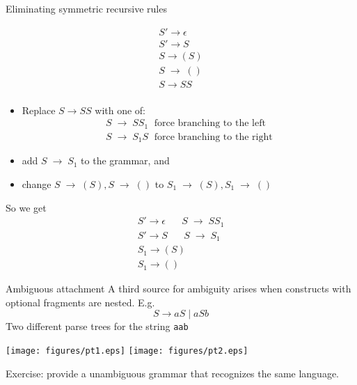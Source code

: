 \documentclass{prosper}%
\newcommand{\ra}{\mbox{$\;\rightarrow\;$}}
\begin{document}
\begin{slide}{Eliminating symmetric recursive rules}
\begin{minipage}{3cm}
\[
\begin{array}{l}
S'\rightarrow \epsilon\\
S'\rightarrow S\\
S\rightarrow (S)\\
S\ra ()\\

S \rightarrow SS\\
\end{array}
\]
\end{minipage}
\begin{minipage}{8cm}
\begin{itemize}
\item Replace    $S \rightarrow  SS$ with one of:
\[
\begin{array}{l}
    S \ra SS_1 \;\mbox{		 force branching to the left}\\
    S \ra S_1S 	\;\mbox{	 force branching to the right}
\end{array}
\]
\item add $S\ra S_1$ to the grammar, and 
\item change $S\ra (S), S\ra ()$ to $S_1\ra (S), S_1\ra ()$
\end{itemize}
\end{minipage}

\vspace{0.5cm}
So we get
\[
\begin{array}{l}
S'\rightarrow \epsilon\;\;\;\;\;\;S\ra SS_1\\
S'\rightarrow S\;\;\;\;\;\;S\ra S_1\\
S_1\rightarrow (S)\\
S_1\rightarrow ()
\end{array}
\]
\end{slide}


\begin{slide}{Ambiguous attachment}
A third source for ambiguity arises when constructs with optional fragments are nested. E.g.
\[
S \rightarrow aS \;|\; aSb
\]
Two different parse trees for the string {\tt aab}

\begin{center}
\texttt{[image: figures/pt1.eps]}
\hspace{1cm}
\texttt{[image: figures/pt2.eps]}
\end{center}
Exercise: provide a unambiguous grammar that recognizes the same language.
\end{slide}
\end{document}
